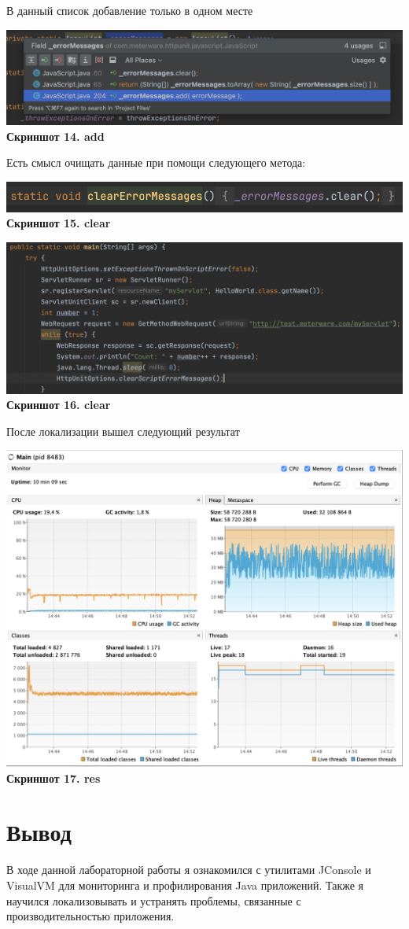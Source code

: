 \documentclass{article}
\begin{document}
В данный список добавление только в одном месте

\begin{center}
    \includegraphics[width=.8\textwidth]{find.png}\\
    \textbf{Скриншот 14. add}
\end{center}

Есть смысл очищать данные при помощи следующего метода:

\begin{center}
    \includegraphics[width=.8\textwidth]{clear.png}\\
    \textbf{Скриншот 15. clear}
\end{center}
\begin{center}
    \includegraphics[width=.8\textwidth]{solve.png}\\
    \textbf{Скриншот 16. clear}
\end{center}
После локализации вышел следующий результат
\begin{center}
    \includegraphics[width=.8\textwidth]{result.png}\\
    \textbf{Скриншот 17. res}
\end{center}
\section{Вывод}
В ходе данной лабораторной работы я ознакомился с утилитами JConsole и VisualVM для мониторинга и профилирования Java приложений. 
Также я научился локализовывать и устранять проблемы, связанные с производительностью приложения.
\end{document}
